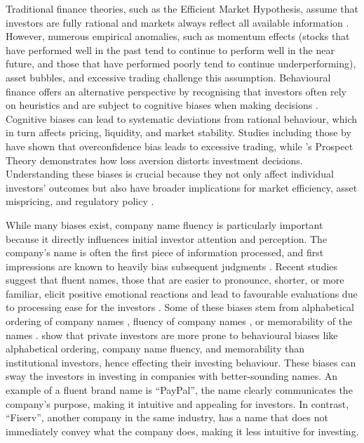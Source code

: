 \documentclass[a4paper,11pt]{report}
\begin{document}
Traditional finance theories, such as the Efficient Market Hypothesis, assume that investors are fully rational and markets always reflect all available information \cite{cog_bias_finance}. However, numerous empirical anomalies, such as momentum effects (stocks that have performed well in the past tend to continue to perform well in the near future, and those that have performed poorly tend to continue underperforming), asset bubbles, and excessive trading challenge this assumption. Behavioural finance offers an alternative perspective by recognising that investors often rely on heuristics and are subject to cognitive biases when making decisions \cite{cog_bias_finance1}. Cognitive biases can lead to systematic deviations from rational behaviour, which in turn affects pricing, liquidity, and market stability. Studies including those by  have shown that overconfidence bias leads to excessive trading, while 's Prospect Theory demonstrates how loss aversion distorts investment decisions. Understanding these biases is crucial because they not only affect individual investors' outcomes but also have broader implications for market efficiency, asset mispricing, and regulatory policy \cite{cog_bias_market}.

While many biases exist, company name fluency is particularly important because it directly influences initial investor attention and perception. The company's name is often the first piece of information processed, and first impressions are known to heavily bias subsequent judgments \cite{why_bias}. Recent studies suggest that fluent names, those that are easier to pronounce, shorter, or more familiar, elicit positive emotional reactions and lead to favourable evaluations due to processing ease for the investors \cite{why_bias2}. Some of these biases stem from alphabetical ordering of company names \cite{alpha}, fluency of company names \cite{fluency, fleuncy2_main}, or memorability of the names \cite{memory}.  show that private investors are more prone to behavioural biases like alphabetical ordering, company name fluency, and memorability than institutional investors, hence effecting their investing behaviour. These biases can sway the investors in investing in companies with better-sounding names. An example of a fluent brand name is ``PayPal'', the name clearly communicates the company's purpose, making it intuitive and appealing for investors. In contrast, ``Fiserv'', another company in the same industry, has a name that does not immediately convey what the company does, making it less intuitive for investing. 
\end{document}
